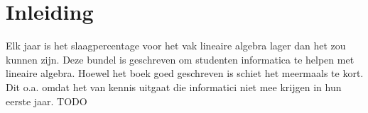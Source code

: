 \documentclass[lineaire_algebra_oplossingen.tex]{subfiles}
\begin{document}
\newpage
\section*{Inleiding}
Elk jaar is het slaagpercentage voor het vak lineaire algebra lager dan het zou kunnen zijn. Deze bundel is geschreven om studenten informatica te helpen met lineaire algebra. Hoewel het boek goed geschreven is schiet het meermaals te kort. Dit o.a. omdat het van kennis uitgaat die informatici niet mee krijgen in hun eerste jaar.
TODO
\end{document}
